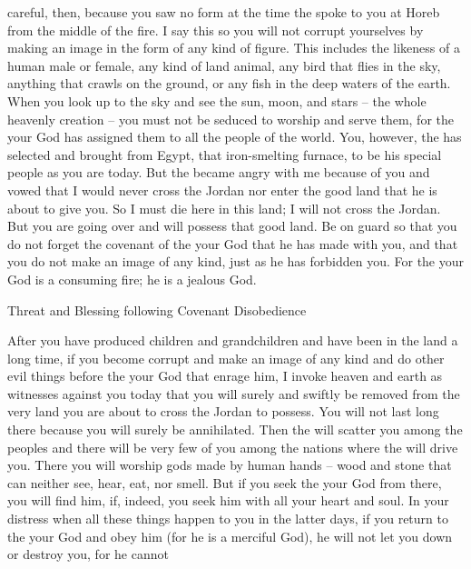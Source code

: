 {careful,
then, because
you saw
no
form
at the time
the {}
spoke
to
you at Horeb
from the middle
of the fire.
I say
this so
you will not corrupt
yourselves by making
an image
in the form
of any
kind of figure.
This includes the likeness
of a human male
or
female,
any
kind
of land
animal,
any
bird
that
flies
in the sky,
anything
that crawls
on the ground,
or any
fish
in the deep waters
of the earth.
When you look up
to the sky
and see
the sun,
moon,
and stars
– the whole
heavenly
creation –
you must not be seduced
to worship
and serve
them, for the
{}
your God
has assigned
them to all
the people
of the world.
You, however, the
{}
has selected
and brought
from Egypt,
that iron-smelting
furnace,
to be
his special
people
as you are today.
But the
{}
became angry
with me because
of you and vowed
that I would never
cross
the Jordan
nor
enter
the good
land
that
he
is about to give
you.
So I
must die
here
in this
land;
I will not
cross
the Jordan.
But you
are going
over and will possess
that good
land.
Be on guard
so
that you do not forget
the covenant
of the {}
your God
that
he has made
with
you, and that you do
not make an image
of any kind,
just as
he
has forbidden you.
For
the {}
your God
is a consuming
fire;
he is
a jealous
God.
\par }{\SH Threat and Blessing following Covenant Disobedience
\par }{\PP {}After
you have produced
children
and grandchildren
and have been in the land
a long time,
if you become corrupt
and make
an image
of any kind
and do
other evil things
before
the {}
your God
that enrage him,
I invoke
heaven
and earth
as
witnesses against you today
that
you will surely
and swiftly
be removed
from the very land
you
are about to cross
the Jordan
to possess.
You will not
last long
there
because
you will surely be annihilated.
Then the
{}
will scatter
you among the
peoples
and there
will be very few
of you among the nations
where
the {}
will drive you.
There
you will worship
gods
made
by human
hands
– wood
and stone
that
can neither
see,
hear,
eat,
nor
smell.
But if you seek
the {}
your God
from there,
you will find
him, if, indeed,
you seek
him with all
your heart
and soul.
In your distress
when all
these
things
happen
to you in the latter
days,
if you return
to
the {}
your God
and obey
him
(for
he is a merciful
God), he will not
let
you down or
destroy
you, for he cannot
}
